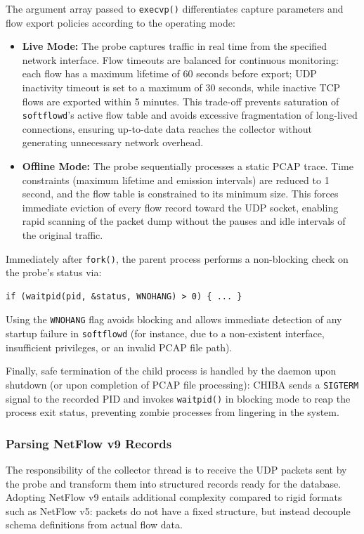 \documentclass[11pt,a4paper]{article}
\newenvironment{codebox}[1][]{%
    \begin{tcolorbox}[
        colback=codebg,
        colframe=codeframe,
        boxrule=0.6pt,
        arc=1.5mm,
        left=3mm,
        right=3mm,
        top=2mm,
        bottom=2mm,
        fonttitle=\sffamily\bfseries\footnotesize,
        coltitle=chibadark,
        colbacktitle=codeframe!50!white,
        #1
    ]
}{%
    \end{tcolorbox}
}
\begin{document}
The argument array passed to \texttt{execvp()} differentiates capture parameters and flow export policies according to the operating mode:
\begin{itemize}
    \item \textbf{Live Mode:} The probe captures traffic in real time from the specified network interface. Flow timeouts are balanced for continuous monitoring: each flow has a maximum lifetime of 60 seconds before export; UDP inactivity timeout is set to a maximum of 30 seconds, while inactive TCP flows are exported within 5 minutes. This trade-off prevents saturation of \texttt{softflowd}'s active flow table and avoids excessive fragmentation of long-lived connections, ensuring up-to-date data reaches the collector without generating unnecessary network overhead.
    \item \textbf{Offline Mode:} The probe sequentially processes a static PCAP trace. Time constraints (maximum lifetime and emission intervals) are reduced to 1 second, and the flow table is constrained to its minimum size. This forces immediate eviction of every flow record toward the UDP socket, enabling rapid scanning of the packet dump without the pauses and idle intervals of the original traffic.
\end{itemize}

Immediately after \texttt{fork()}, the parent process performs a non-blocking check on the probe's status via:
\begin{codebox}[title={Non-Blocking Child Process Check (C)}]
\footnotesize
\begin{verbatim}
if (waitpid(pid, &status, WNOHANG) > 0) { ... }
\end{verbatim}
\end{codebox}
Using the \texttt{WNOHANG} flag avoids blocking and allows immediate detection of any startup failure in \texttt{softflowd} (for instance, due to a non-existent interface, insufficient privileges, or an invalid PCAP file path).

Finally, safe termination of the child process is handled by the daemon upon shutdown (or upon completion of PCAP file processing): CHIBA sends a \texttt{SIGTERM} signal to the recorded PID and invokes \texttt{waitpid()} in blocking mode to reap the process exit status, preventing zombie processes from lingering in the system.

\subsubsection{Parsing NetFlow v9 Records}
The responsibility of the collector thread is to receive the UDP packets sent by the probe and transform them into structured records ready for the database. Adopting NetFlow v9 entails additional complexity compared to rigid formats such as NetFlow v5: packets do not have a fixed structure, but instead decouple schema definitions from actual flow data.
\end{document}
